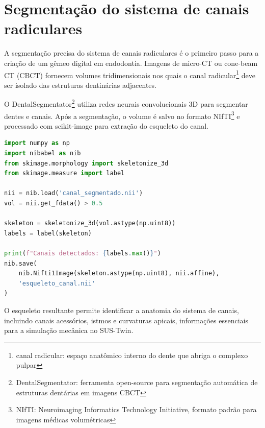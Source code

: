 

\label{sec:endodontia}

\section{Segmentação do sistema de canais radiculares}

A segmentação precisa do sistema de canais radiculares é o primeiro passo para a criação de um gêmeo digital em endodontia. Imagens de micro-CT ou cone-beam CT (CBCT) fornecem volumes tridimensionais nos quais o canal radicular{\footnote{canal radicular: espaço anatômico interno do dente que abriga o complexo pulpar}} deve ser isolado das estruturas dentinárias adjacentes.

O DentalSegmentator{\footnote{DentalSegmentator: ferramenta open-source para segmentação automática de estruturas dentárias em imagens CBCT}} utiliza redes neurais convolucionais 3D para segmentar dentes e canais. Após a segmentação, o volume é salvo no formato NIfTI{\footnote{NIfTI: Neuroimaging Informatics Technology Initiative, formato padrão para imagens médicas volumétricas}} e processado com scikit-image para extração do esqueleto do canal.

\begin{lstlisting}[language=Python,caption={Segmentação e esqueletização do canal radicular com scikit-image}]
import numpy as np
import nibabel as nib
from skimage.morphology import skeletonize_3d
from skimage.measure import label

nii = nib.load('canal_segmentado.nii')
vol = nii.get_fdata() > 0.5

skeleton = skeletonize_3d(vol.astype(np.uint8))
labels = label(skeleton)

print(f"Canais detectados: {labels.max()}")
nib.save(
    nib.Nifti1Image(skeleton.astype(np.uint8), nii.affine),
    'esqueleto_canal.nii'
)
\end{lstlisting}

O esqueleto resultante permite identificar a anatomia do sistema de canais, incluindo canais acessórios, istmos e curvaturas apicais, informações essenciais para a simulação mecânica no SUS-Twin.

